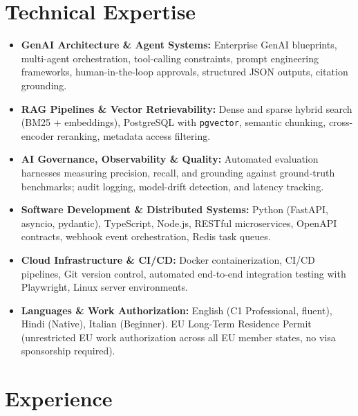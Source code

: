 \documentclass[10pt,a4paper]{article}
\begin{document}
\section{Technical Expertise}
\begin{itemize}
  \item \textbf{GenAI Architecture \& Agent Systems:} Enterprise GenAI blueprints, multi-agent orchestration, tool-calling constraints, prompt engineering frameworks, human-in-the-loop approvals, structured JSON outputs, citation grounding.
  \item \textbf{RAG Pipelines \& Vector Retrievability:} Dense and sparse hybrid search (BM25 + embeddings), PostgreSQL with \texttt{pgvector}, semantic chunking, cross-encoder reranking, metadata access filtering.
  \item \textbf{AI Governance, Observability \& Quality:} Automated evaluation harnesses measuring precision, recall, and grounding against ground-truth benchmarks; audit logging, model-drift detection, and latency tracking.
  \item \textbf{Software Development \& Distributed Systems:} Python (FastAPI, asyncio, pydantic), TypeScript, Node.js, RESTful microservices, OpenAPI contracts, webhook event orchestration, Redis task queues.
  \item \textbf{Cloud Infrastructure \& CI/CD:} Docker containerization, CI/CD pipelines, Git version control, automated end-to-end integration testing with Playwright, Linux server environments.
  \item \textbf{Languages \& Work Authorization:} English (C1 Professional, fluent), Hindi (Native), Italian (Beginner). EU Long-Term Residence Permit (unrestricted EU work authorization across all EU member states, no visa sponsorship required).
\end{itemize}

\section{Experience}
\end{document}
